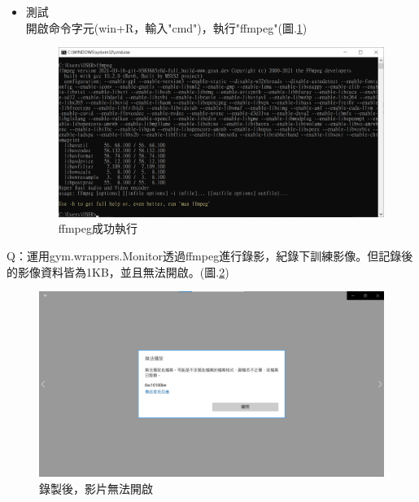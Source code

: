 \documentclass[14pt,a4paper]{report}  %
\begin{document}
\newpage %
\fontsize{14pt}{28pt}\selectfont

\begin{itemize}
\item 測試\\
開啟命令字元(win+R，輸入"cmd")，執行"ffmpeg"(圖.\ref{fig.Q_ffmpeg-5})\\

\begin{figure}[hbt!]
\begin{center}
\includegraphics[width=15cm]{Q_ffmpeg-5}
\caption{\Large ffmpeg成功執行}
\label{fig.Q_ffmpeg-5}
\end{center}
\end{figure}
\end{itemize}
\newpage%
\hspace{-1.7em} Q：運用gym.wrappers.Monitor透過ffmpeg進行錄影，紀錄下訓練影像。但記錄後的影像資料皆為1KB，並且無法開啟。(圖.\ref{fig.ffmpeg_mp4})\\
\begin{figure}[hbt!]
\begin{center}
\includegraphics[width=15cm]{ffmpeg_mp4}
\caption{\Large 錄製後，影片無法開啟}
\label{fig.ffmpeg_mp4}
\end{center}
\end{figure}
\\%
\end{document}
